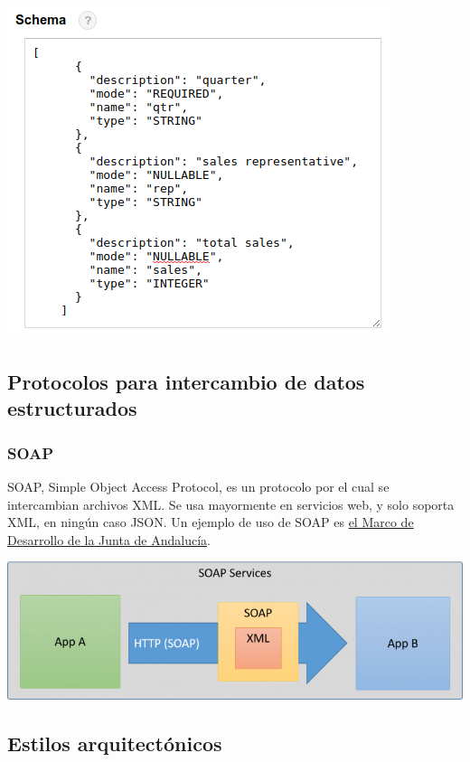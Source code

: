 \documentclass{article}
\begin{document}
\begin{center}
\includegraphics[scale=0.3]{images/json.png}
\end{center}

\subsection{Protocolos para intercambio de datos estructurados}

\subsubsection{SOAP}

SOAP, Simple Object Access Protocol, es un protocolo por el cual se intercambian archivos XML. Se usa mayormente en servicios web, y solo soporta XML, en ningún caso JSON. Un ejemplo de uso de SOAP es \href{http://www.juntadeandalucia.es/servicios/madeja/contenido/recurso/41}{el Marco de Desarrollo de la Junta de Andalucía}.

\begin{center}
\includegraphics[scale=0.4]{images/soap.png}
\end{center}

\subsection{Estilos arquitectónicos}
\end{document}
